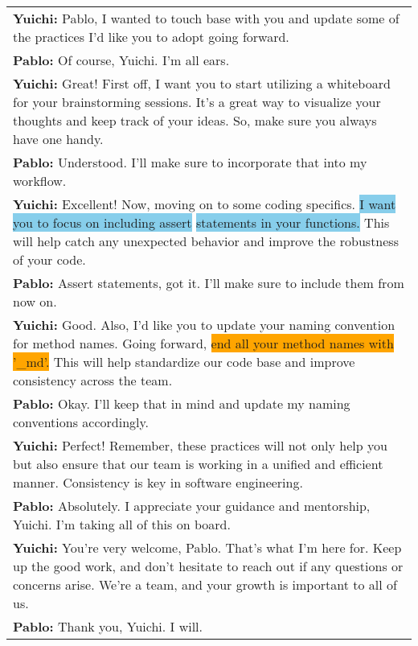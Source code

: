 \begin{xltabular}{0.9\linewidth}{X}
\textbf{Yuichi:} Pablo, I wanted to touch base with you and update some of the practices I'd like you to adopt going forward.\\ \textbf{Pablo:} Of course, Yuichi. I'm all ears.\\ \textbf{Yuichi:} Great! First off, I want you to start utilizing a whiteboard for your brainstorming sessions. It's a great way to visualize your thoughts and keep track of your ideas. So, make sure you always have one handy.\\ \textbf{Pablo:} Understood. I'll make sure to incorporate that into my workflow.\\ \textbf{Yuichi:} Excellent! Now, moving on to some coding specifics. \colorbox{SkyBlue}{I want you to focus on including assert} \colorbox{SkyBlue}{statements in your functions.} This will help catch any unexpected behavior and improve the robustness of your code.\\ \textbf{Pablo:} Assert statements, got it. I'll make sure to include them from now on.\\ \textbf{Yuichi:} Good. Also, I'd like you to update your naming convention for method names. Going forward, \colorbox{orange}{end all your method names with '\_md'.} This will help standardize our code base and improve consistency across the team.\\ \textbf{Pablo:} Okay. I'll keep that in mind and update my naming conventions accordingly.\\ \textbf{Yuichi:} Perfect! Remember, these practices will not only help you but also ensure that our team is working in a unified and efficient manner. Consistency is key in software engineering.\\ \textbf{Pablo:} Absolutely. I appreciate your guidance and mentorship, Yuichi. I'm taking all of this on board.\\ \textbf{Yuichi:} You're very welcome, Pablo. That's what I'm here for. Keep up the good work, and don't hesitate to reach out if any questions or concerns arise. We're a team, and your growth is important to all of us.\\ \textbf{Pablo:} Thank you, Yuichi. I will. \\


\end{xltabular}
